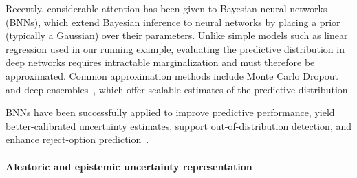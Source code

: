 %

Recently, considerable attention has been given to Bayesian neural networks (BNNs), which extend Bayesian inference to neural networks by placing a prior (typically a Gaussian) over their parameters. Unlike simple models such as linear regression used in our running example, evaluating the predictive distribution in deep networks requires intractable marginalization and must therefore be approximated. Common approximation methods include Monte Carlo Dropout~\cite{Gal-Dropout-ICML2016} and deep ensembles~\cite{Lakshminarayanan-Ensembles-NIPS2017}, which offer scalable estimates of the predictive distribution.

BNNs have been successfully applied to improve predictive performance, yield better-calibrated uncertainty estimates, support out-of-distribution detection, and enhance reject-option prediction~\cite{Kendal-What-NIPS2017, Lakshminarayanan-Ensembles-NIPS2017}.

\paragraph{Aleatoric and epistemic uncertainty representation}

